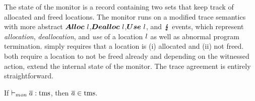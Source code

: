\documentclass[acmsmall,review,screen,dvipsnames]{acmart}
\begin{document}
\begin{center}
  $\;$\\
\end{center}

The state of the monitor is a record containing two sets that keep track of allocated and freed locations.
The monitor runs on a modified trace semantics with more abstract $\bm{Alloc\ }l$,$\bm{Dealloc\ }l$,$\bm{Use\ }l$, and $\lightning{\kern-5.5pt}\lightning$ events, which represent {\em allocation}, {\em deallocation}, and {\em use} of a location $l$ as well as abnormal program termination.
 simply requires that a location is (i) allocated and (ii) not freed.
 both require a location to not be freed already and depending on the witnessed action, extend the internal state of the monitor.
The trace agreement is entirely straightforward.

\begin{lemma}\label{lem:mon:tmsafe}
  If $\vdash_{mon}{\overline{a}}:{\operatorname{tms}}$, then $\overline{a}\in\operatorname{tms}$.\Coqed
\end{lemma}
\end{document}
